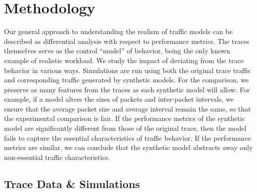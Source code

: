 \documentclass[conference]{IEEEtran}
\newcommand{\caps}[1]{{\small{#1}}}
\begin{document}
\section{Methodology}\label{sec:methodology}

Our general approach to understanding the realism of traffic models can be described as differential analysis with respect to performance metrics. The traces themselves serve as the control ``model'' of behavior, being the only known example of realistic workload. We study the impact of deviating from the trace behavior in various ways. Simulations are run using both the original trace traffic and corresponding traffic generated by synthetic models. For the comparison, we preserve as many features from the traces as each synthetic model will allow. For example, if a model alters the sizes of packets and inter-packet intervals, we ensure that the average packet size and average interval remain the same, so that the experimental comparison is fair. If the performance metrics of the synthetic model are significantly different from those of the original trace, then the model fails to capture the essential characteristics of traffic behavior. If the performance metrics are similar, we can conclude that the synthetic model abstracts away only non-essential traffic characteristics.


\subsection{Trace Data \& Simulations}\label{sec:trace-data}\label{sec:simulations}
\end{document}
